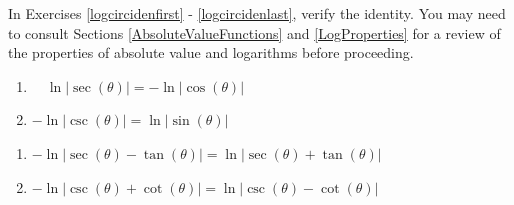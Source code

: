 \pagebreak

In Exercises \ref{logcircidenfirst} - \ref{logcircidenlast}, verify the identity.  You may need to consult Sections \ref{AbsoluteValueFunctions} and \ref{LogProperties} for a review of the properties of absolute value and logarithms before proceeding.

\begin{multicols}{2}

\begin{enumerate}

\setcounter{enumi}{\value{HW}}

\item  $\quad \ln|\sec(\theta)| = -\ln|\cos(\theta)|$ \label{logcircidenfirst}
\item  $-\ln|\csc(\theta)| = \ln|\sin(\theta)|$

\setcounter{HW}{\value{enumi}}

\end{enumerate}

\end{multicols}

\begin{multicols}{2}

\begin{enumerate}

\setcounter{enumi}{\value{HW}}

\item  $-\ln|\sec(\theta) - \tan(\theta)| = \ln|\sec(\theta)+\tan(\theta)|$
\item  $-\ln|\csc(\theta) + \cot(\theta)|= \ln|\csc(\theta) - \cot(\theta)|$ \label{logcircidenlast}

\setcounter{HW}{\value{enumi}}

\end{enumerate}

\end{multicols}

